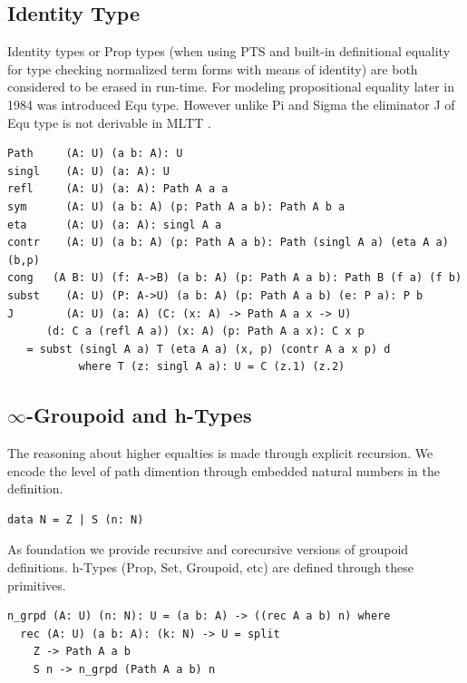\documentclass{article}
\begin{document}
\subsection{Identity Type}

Identity types or Prop types (when using PTS and built-in definitional equality for type checking
normalized term forms with means of identity) are both considered to be erased in run-time.
For modeling propositional equality later in 1984 was introduced Equ type. \cite{Lof84}
However unlike Pi and Sigma the eliminator J of Equ type is
not derivable in MLTT \cite{Hofmann96, Mortberg17, HoTT}.

\begin{lstlisting}[mathescape=true]
Path     (A: U) (a b: A): U
singl    (A: U) (a: A): U
refl     (A: U) (a: A): Path A a a
sym      (A: U) (a b: A) (p: Path A a b): Path A b a
eta      (A: U) (a: A): singl A a
contr    (A: U) (a b: A) (p: Path A a b): Path (singl A a) (eta A a) (b,p)
cong   (A B: U) (f: A->B) (a b: A) (p: Path A a b): Path B (f a) (f b)
subst    (A: U) (P: A->U) (a b: A) (p: Path A a b) (e: P a): P b
J        (A: U) (a: A) (C: (x: A) -> Path A a x -> U)
      (d: C a (refl A a)) (x: A) (p: Path A a x): C x p
   = subst (singl A a) T (eta A a) (x, p) (contr A a x p) d
           where T (z: singl A a): U = C (z.1) (z.2)
\end{lstlisting}

\subsection{$\infty$-Groupoid and h-Types}

The reasoning about higher equalties is made through explicit recursion.
We encode the level of path dimention through embedded natural numbers in the definition.

\begin{lstlisting}[mathescape=true]
data N = Z | S (n: N)
\end{lstlisting}

As foundation we provide recursive and corecursive versions of groupoid definitions.
h-Types \cite{HoTT} (Prop, Set, Groupoid, etc) are defined through these primitives.

\begin{lstlisting}[mathescape=true]
n_grpd (A: U) (n: N): U = (a b: A) -> ((rec A a b) n) where
  rec (A: U) (a b: A): (k: N) -> U = split
    Z -> Path A a b
    S n -> n_grpd (Path A a b) n
\end{lstlisting}
\end{document}
